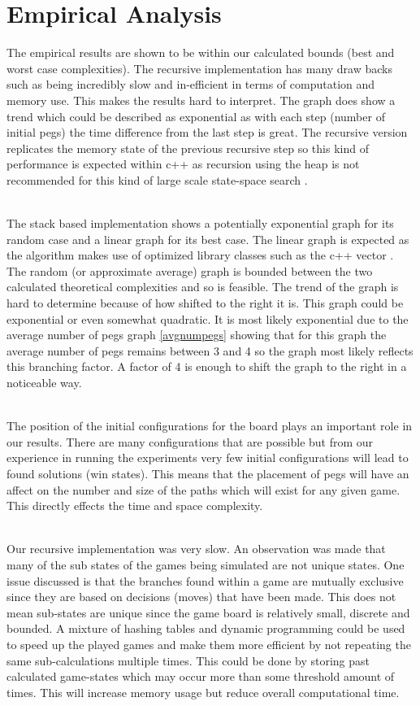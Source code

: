 \documentclass[a4paper]{article}
\begin{document}
\section{Empirical Analysis}
The empirical results are shown to be within our calculated bounds (best and worst case complexities). The recursive implementation has many draw backs such as being incredibly slow and in-efficient in terms of computation and memory use. This makes the results hard to interpret. The graph does show a trend which could be described as exponential as with each step (number of initial pegs) the time difference from the last step is great. The recursive version replicates the memory state of the previous recursive step so this kind of performance is expected within c++ as recursion using the heap is not recommended for this kind of large scale state-space search \cite{bronson2012}.\\\

\noindent The stack based implementation shows a potentially exponential graph for its random case and a linear graph for its best case. The linear graph is expected as the algorithm makes use of optimized library classes such as the c++ vector \cite{bronson2012}. The random (or approximate average) graph is bounded between the two calculated theoretical complexities and so is feasible. The trend of the graph is hard to determine because of how shifted to the right it is. This graph could be exponential or even somewhat quadratic. It is most likely exponential due to the average number of pegs graph \ref{avgnumpegs} showing that for this graph the average number of pegs remains between 3 and 4 so the graph most likely reflects this branching factor. A factor of 4 is enough to shift the graph to the right in a noticeable way. \\\

\noindent The position of the initial configurations for the board plays an important role in our results. There are many configurations that are possible but from our experience in running the experiments very few initial configurations will lead to found solutions (win states). This means that the placement of pegs will have an affect on the number and size of the paths which will exist for any given game. This directly effects the time and space complexity. \\\

\noindent Our recursive implementation was very slow. An observation was made that many of the sub states of the games being simulated are not unique states. One issue discussed is that the branches found within a game are mutually exclusive since they are based on decisions (moves) that have been made. This does not mean sub-states are unique since the game board is relatively small, discrete and bounded.  A mixture of hashing tables and dynamic programming could be used to speed up the played games and make them more efficient by not repeating the same sub-calculations multiple times. This could be done by storing past calculated game-states which may occur more than some threshold amount of times. This will increase memory usage but reduce overall computational time.
\end{document}
